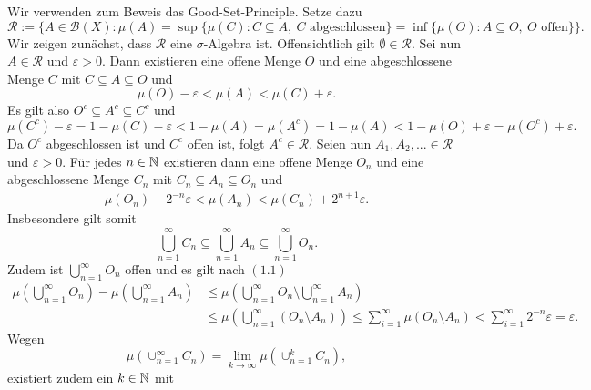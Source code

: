 \begin{proof*}
    Wir verwenden zum Beweis das Good-Set-Principle. Setze dazu
    $$
        \mathcal{R}:=\big\{A \in \mathcal{B}(X):  \mu(A) = \sup\{\mu(C): C \subseteq A, \ C \text{ abgeschlossen}\} =\inf\{\mu(O): A \subseteq O, \ O \text{ offen}\} \big\}.
    $$
    Wir zeigen zunächst, dass $\mathcal{R}$ eine $\sigma$-Algebra ist. Offensichtlich gilt $\emptyset \in \mathcal{R}$. Sei nun $A \in \mathcal{R}$ und $\varepsilon > 0$. 
    Dann existieren eine offene Menge $O$ und eine abgeschlossene Menge $C$ mit $C \subseteq A \subseteq O$ und 
    $$
        \mu(O) - \varepsilon < \mu(A) < \mu(C) + \varepsilon.
    $$
    Es gilt also $O^c \subseteq A^c \subseteq C^c$ und 
    $$
        \mu(C^c) - \varepsilon = 1 - \mu(C) - \varepsilon < 1 - \mu(A) = \mu(A^c) = 1 - \mu(A) < 1 - \mu(O) + \varepsilon = \mu(O^c) + \varepsilon. 
    $$
    Da $O^c$ abgeschlossen ist und $C^c$ offen ist, folgt $A^c \in \mathcal{R}$. 
    \newline 
    Seien nun $A_1, A_2,... \in \mathcal{R}$ und $\varepsilon > 0$. Für jedes $n \in \mathbb{N}$ existieren dann eine offene Menge $O_n$ und eine abgeschlossene Menge $C_n$ mit $C_n \subseteq A_n \subseteq O_n$ und 
    \begin{align}
        \mu(O_n) - 2^{-n}\varepsilon < \mu(A_n) < \mu(C_n) + 2^{n+1}\varepsilon.
    \end{align}
    Insbesondere gilt somit
    $$
        \bigcup_{n = 1}^{\infty} C_n \subseteq \bigcup_{n=1}^{\infty} A_n \subseteq \bigcup_{n=1}^{\infty}O_n.
    $$
    Zudem ist $\bigcup_{n=1}^{\infty}O_n$ offen und es gilt nach $(1.1)$
    \begin{align}
        \mu\left(\bigcup_{n =1}^{\infty}O_n\right) - \mu\left(\bigcup_{n=1}^{\infty}A_n\right) &\leq \mu\left(\bigcup_{n =1}^{\infty}O_n\setminus \bigcup_{n =1}^{\infty} A_n\right) \nonumber \\\
                                                                                &\leq \mu\left(\bigcup_{n =1}^{\infty}(O_n\setminus A_n)\right) 
                                                                                \leq \sum_{i=1}^{\infty}\mu(O_n\setminus A_n)
                                                                                < \sum_{i=1}^{\infty}2^{-n}\varepsilon = \varepsilon. 
    \end{align}
    Wegen 
    $$
    \mu(\cup_{n = 1}^{\infty}C_n) = \lim_{k \to \infty}\mu(\cup_{n=1}^kC_n),
    $$
    existiert zudem ein $k \in \mathbb{N}$ mit 
    \begin{align}

\end{align}
\end{proof*}
